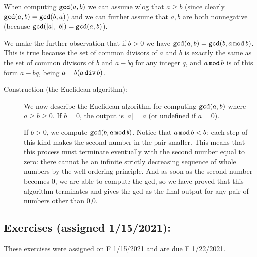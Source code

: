 \documentclass[12pt]{article}
\begin{document}
When computing ${\tt gcd}(a,b)$ we can assume wlog that $a \geq b$ (since clearly ${\tt gcd}(a,b)={\tt gcd}(b,a)$)
and we can further assume that $a,b$ are both nonnegative (because ${\tt gcd}(|a|,|b|)={\tt gcd}(a,b)$).

We make the further observation that if $b >0$ we have ${\tt gcd}(a,b) = {\tt gcd}(b,a \,{\tt mod}\, b)$.
This is true because the set of common divisors of $a$ and $b$ is exactly the same as the set of common divisors of $b$ and $a-bq$ for any integer $q$, and $a \,{\tt mod}\, b$ is of this form $a-bq$, being $a-b(a\,{\tt div}\,b)$.

\begin{description}

\item[Construction (the Euclidean algorithm):]  We now describe the Euclidean algorithm for computing ${\tt gcd}(a,b)$ where $a \geq b \geq 0$.
If $b=0$, the output is $|a|=a$ (or undefined if $a=0$).

If $b>0$, we compute ${\tt gcd}(b,a\,{\tt mod}\,b)$.   Notice that $a\,{\tt mod}\,b<b$:  each step of this kind makes the second number in the pair smaller.  This means that this process must terminate eventually with the second number equal to zero:   there cannot be an infinite strictly decreasing sequence of whole numbers by the well-ordering principle.
And as soon as the second number becomes 0, we are able to compute the gcd, so we have proved that this algorithm terminates and gives the gcd as the final output for any pair of numbers other than 0,0.

\end{description}

\subsection{Exercises (assigned 1/15/2021):}  

These exercises were assigned on F 1/15/2021 and are due F 1/22/2021.
\end{document}
